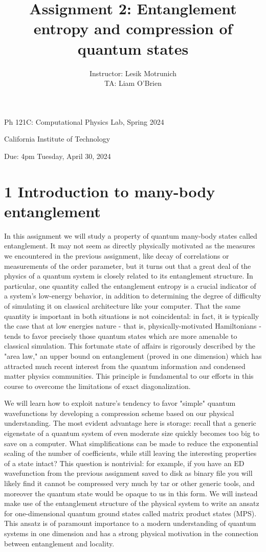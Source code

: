 \documentclass[12pt]{article}
\title{Assignment 2: Entanglement entropy and compression of quantum states }
\author{Instructor: Lesik Motrunich\\
TA: Liam O'Brien}
\date{}
\begin{document}
\maketitle
Ph 121C: Computational Physics Lab, Spring 2024

California Institute of Technology

Due: 4pm Tuesday, April 30, 2024

\section*{1 Introduction to many-body entanglement}
In this assignment we will study a property of quantum many-body states called entanglement. It may not seem as directly physically motivated as the measures we encountered in the previous assignment, like decay of correlations or measurements of the order parameter, but it turns out that a great deal of the physics of a quantum system is closely related to its entanglement structure. In particular, one quantity called the entanglement entropy is a crucial indicator of a system's low-energy behavior, in addition to determining the degree of difficulty of simulating it on classical architecture like your computer. That the same quantity is important in both situations is not coincidental: in fact, it is typically the case that at low energies nature - that is, physically-motivated Hamiltonians - tends to favor precisely those quantum states which are more amenable to classical simulation. This fortunate state of affairs is rigorously described by the "area law," an upper bound on entanglement (proved in one dimension) which has attracted much recent interest from the quantum information and condensed matter physics communities. This principle is fundamental to our efforts in this course to overcome the limitations of exact diagonalization.

We will learn how to exploit nature's tendency to favor "simple" quantum wavefunctions by developing a compression scheme based on our physical understanding. The most evident advantage here is storage: recall that a generic eigenstate of a quantum system of even moderate size quickly becomes too big to save on a computer. What simplifications can be made to reduce the exponential scaling of the number of coefficients, while still leaving the interesting properties of a state intact? This question is nontrivial: for example, if you have an ED wavefunction from the previous assignment saved to disk as binary file you will likely find it cannot be compressed very much by tar or other generic tools, and moreover the quantum state would be opaque to us in this form. We will instead make use of the entanglement structure of the physical system to write an ansatz for one-dimensional quantum ground states called matrix product states (MPS). This ansatz is of paramount importance to a modern understanding of quantum systems in one dimension and has a strong physical motivation in the connection between entanglement and locality.
\end{document}
